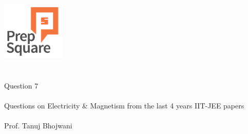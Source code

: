 \documentclass{beamer}
\begin{document}
\begin{center}
\ \\ \ \\
\includegraphics[width=30mm]{Logo-final.png} \\
\ \\ \ \\ 
{\huge Question 7 \\ \ \\ }
{\Large
Questions on Electricity \& Magnetism from the last 4 years IIT-JEE papers
}
{\large \ \\ \ \\ Prof. Tanuj Bhojwani }
\end{center}
\end{document}
